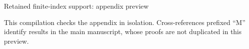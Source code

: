 \documentclass[11pt,a4paper]{article}
\theoremstyle{definition}
\begin{document}
\begin{center}\Large Retained finite-index support: appendix preview\end{center}
\noindent This compilation checks the appendix in isolation. Cross-references prefixed ``M'' identify results in the main manuscript, whose proofs are not duplicated in this preview.

\appendix

\end{document}
